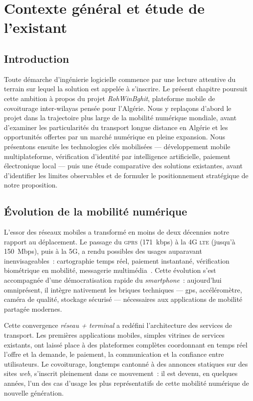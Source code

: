 \chapter{Contexte général et étude de l'existant}
\label{chap:etat-art}

\section*{Introduction}

Toute démarche d'ingénierie logicielle commence par une lecture attentive du terrain sur lequel la solution est appelée à s'inscrire. Le présent chapitre poursuit cette ambition à propos du projet \textit{RohWinBghit}, plateforme mobile de covoiturage inter-wilayas pensée pour l'Algérie. Nous y replaçons d'abord le projet dans la trajectoire plus large de la mobilité numérique mondiale, avant d'examiner les particularités du transport longue distance en Algérie et les opportunités offertes par un marché numérique en pleine expansion. Nous présentons ensuite les technologies clés mobilisées --- développement mobile multiplateforme, vérification d'identité par intelligence artificielle, paiement électronique local --- puis une étude comparative des solutions existantes, avant d'identifier les limites observables et de formuler le positionnement stratégique de notre proposition.

\section{Évolution de la mobilité numérique}
\label{sec:mobilite-numerique}

L'essor des réseaux mobiles a transformé en moins de deux décennies notre rapport au déplacement. Le passage du \textsc{gprs} (171~kbps) à la 4G \textsc{lte} (jusqu'à 150~Mbps), puis à la 5G, a rendu possibles des usages auparavant inenvisageables~: cartographie temps réel, paiement instantané, vérification biométrique en mobilité, messagerie multimédia~\cite{arpt_2024}. Cette évolution s'est accompagnée d'une démocratisation rapide du \textit{smartphone}~: aujourd'hui omniprésent, il intègre nativement les briques techniques --- \gls{gps}, accéléromètre, caméra de qualité, stockage sécurisé --- nécessaires aux applications de mobilité partagée modernes.

Cette convergence \textit{réseau + terminal} a redéfini l'architecture des services de transport. Les premières applications mobiles, simples vitrines de services existants, ont laissé place à des plateformes complètes coordonnant en temps réel l'offre et la demande, le paiement, la communication et la confiance entre utilisateurs. Le covoiturage, longtemps cantonné à des annonces statiques sur des sites \textit{web}, s'inscrit pleinement dans ce mouvement~: il est devenu, en quelques années, l'un des cas d'usage les plus représentatifs de cette mobilité numérique de nouvelle génération.

